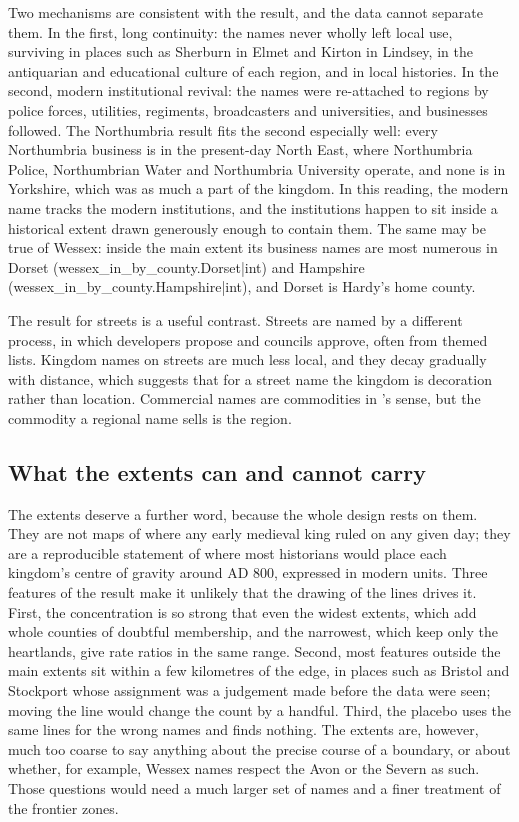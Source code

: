 \documentclass[11pt,a4paper]{article}
\begin{document}
Two mechanisms are consistent with the result, and the data cannot separate them. In the first, long continuity: the names never wholly left local use, surviving in places such as Sherburn in Elmet and Kirton in Lindsey, in the antiquarian and educational culture of each region, and in local histories. In the second, modern institutional revival: the names were re-attached to regions by police forces, utilities, regiments, broadcasters and universities, and businesses followed. The Northumbria result fits the second especially well: every Northumbria business is in the present-day North East, where Northumbria Police, Northumbrian Water and Northumbria University operate, and none is in Yorkshire, which was as much a part of the kingdom. In this reading, the modern name tracks the modern institutions, and the institutions happen to sit inside a historical extent drawn generously enough to contain them. The same may be true of Wessex: inside the main extent its business names are most numerous in Dorset ({{wessex_in_by_county.Dorset|int}}) and Hampshire ({{wessex_in_by_county.Hampshire|int}}), and Dorset is Hardy's home county.

The result for streets is a useful contrast. Streets are named by a different process, in which developers propose and councils approve, often from themed lists. Kingdom names on streets are much less local, and they decay gradually with distance, which suggests that for a street name the kingdom is decoration rather than location. Commercial names are commodities in \citet{lightyoung2015}'s sense, but the commodity a regional name sells is the region.


\subsection{What the extents can and cannot carry}
The extents deserve a further word, because the whole design rests on them. They are not maps of where any early medieval king ruled on any given day; they are a reproducible statement of where most historians would place each kingdom's centre of gravity around AD 800, expressed in modern units. Three features of the result make it unlikely that the drawing of the lines drives it. First, the concentration is so strong that even the widest extents, which add whole counties of doubtful membership, and the narrowest, which keep only the heartlands, give rate ratios in the same range. Second, most features outside the main extents sit within a few kilometres of the edge, in places such as Bristol and Stockport whose assignment was a judgement made before the data were seen; moving the line would change the count by a handful. Third, the placebo uses the same lines for the wrong names and finds nothing. The extents are, however, much too coarse to say anything about the precise course of a boundary, or about whether, for example, Wessex names respect the Avon or the Severn as such. Those questions would need a much larger set of names and a finer treatment of the frontier zones.
\end{document}
